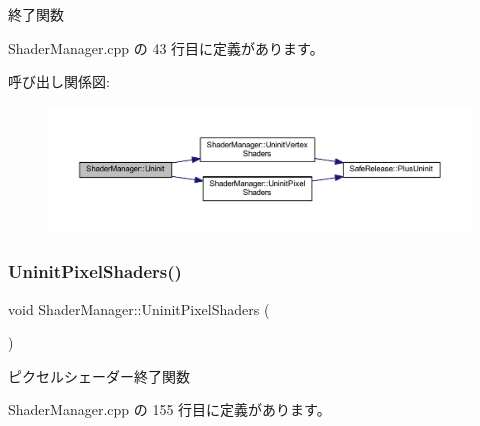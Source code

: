終了関数 



 Shader\+Manager.\+cpp の 43 行目に定義があります。

呼び出し関係図\+:
\nopagebreak
\begin{figure}[H]
\begin{center}
\leavevmode
\includegraphics[width=350pt]{class_shader_manager_afc31a6bbe86e6b57edd7be0972f48ab1_cgraph}
\end{center}
\end{figure}
\mbox{\label{class_shader_manager_a1edd1b68c7949022217f98bce8360d3c}} 
\subsubsection{\texorpdfstring{Uninit\+Pixel\+Shaders()}{UninitPixelShaders()}}
{\footnotesize\ttfamily void Shader\+Manager\+::\+Uninit\+Pixel\+Shaders (\begin{DoxyParamCaption}{ }\end{DoxyParamCaption})\hspace{0.3cm}{\ttfamily [private]}}



ピクセルシェーダー終了関数 



 Shader\+Manager.\+cpp の 155 行目に定義があります。

